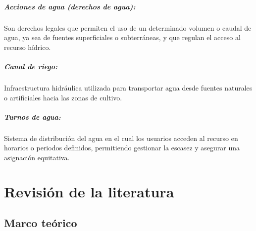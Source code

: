 \documentclass[12pt]{report}
\begin{document}
\paragraph{Acciones de agua (derechos de agua):} 
Son derechos legales que permiten el uso de un determinado volumen o caudal de agua, ya sea de fuentes superficiales o subterráneas, y que regulan el acceso al recurso hídrico.

\vspace{0.2cm}

\paragraph{Canal de riego:} 
Infraestructura hidráulica utilizada para transportar agua desde fuentes naturales o artificiales hacia las zonas de cultivo.

\vspace{0.2cm}

\paragraph{Turnos de agua:} 
Sistema de distribución del agua en el cual los usuarios acceden al recurso en horarios o periodos definidos, permitiendo gestionar la escasez y asegurar una asignación equitativa.
\chapter{Revisión de la literatura}

\section{Marco teórico}
\end{document}
